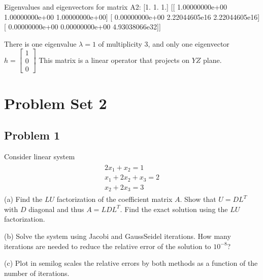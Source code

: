 \documentclass[letterpaper,10pt,english]{jupyterBook}
\begin{document}
\begin{sphinxVerbatim}[commandchars=\\\{\}]
Eigenvalues and eigenvectors for matrix A2:
[1. 1. 1.]
[[ 1.00000000e+00 \PYGZhy{}1.00000000e+00  1.00000000e+00]
 [ 0.00000000e+00  2.22044605e\PYGZhy{}16 \PYGZhy{}2.22044605e\PYGZhy{}16]
 [ 0.00000000e+00  0.00000000e+00  4.93038066e\PYGZhy{}32]]
\end{sphinxVerbatim}

\sphinxAtStartPar
There is one eigenvalue \(\lambda = 1\) of multiplicity 3, and only one eigenvector
\(h = 
\begin{bmatrix}
1\\
0\\
0
\end{bmatrix}
\)
This matrix is a linear operator that projects on \(YZ\) plane.


\chapter{Problem Set 2}
\label{\detokenize{notebooks/ProblemSet2:problem-set-2}}\label{\detokenize{notebooks/ProblemSet2::doc}}

\section{Problem 1}
\label{\detokenize{notebooks/ProblemSet2:problem-1}}
\sphinxAtStartPar
Consider linear system
\begin{equation*}
\begin{split}
\begin{align*}
2x_1 + x_2 = 1\\
x_1 + 2x_2 + x_3 = 2\\
x_2 + 2x_3 = 3
\end{align*}
\end{split}
\end{equation*}
\sphinxAtStartPar
(a) Find the \(LU\) factorization of the coefficient matrix \(A\).   Show that \(U = DL^T\) with \(D\) diagonal and thus \(A=LDL^T\). Find the exact solution using the \(LU\) factorization.

\sphinxAtStartPar
(b) Solve the system using Jacobi and Gauss\sphinxhyphen{}Seidel iterations. How many iterations are needed to reduce the relative error of the solution to \(10^{-8}\)?

\sphinxAtStartPar
(c) Plot in semilog scales the relative errors by both methods as a function of the number of iterations.
\end{document}
